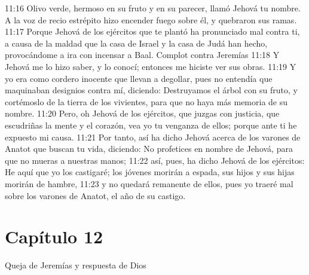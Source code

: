 11:16 Olivo verde, hermoso en su fruto y en su parecer, llamó Jehová tu nombre. A la voz de recio estrépito hizo encender fuego sobre él, y quebraron sus ramas. 
11:17 Porque Jehová de los ejércitos que te plantó ha pronunciado mal contra ti, a causa de la maldad que la casa de Israel y la casa de Judá han hecho, provocándome a ira con incensar a Baal. 
Complot contra Jeremías 
11:18 Y Jehová me lo hizo saber, y lo conocí; entonces me hiciste ver sus obras. 
11:19 Y yo era como cordero inocente que llevan a degollar, pues no entendía que maquinaban designios contra mí, diciendo: Destruyamos el árbol con su fruto, y cortémoslo de la tierra de los vivientes, para que no haya más memoria de su nombre. 
11:20 Pero, oh Jehová de los ejércitos, que juzgas con justicia, que escudriñas la mente y el corazón, vea yo tu venganza de ellos; porque ante ti he expuesto mi causa. 
11:21 Por tanto, así ha dicho Jehová acerca de los varones de Anatot que buscan tu vida, diciendo: No profetices en nombre de Jehová, para que no mueras a nuestras manos; 
11:22 así, pues, ha dicho Jehová de los ejércitos: He aquí que yo los castigaré; los jóvenes morirán a espada, sus hijos y sus hijas morirán de hambre, 
11:23 y no quedará remanente de ellos, pues yo traeré mal sobre los varones de Anatot, el año de su castigo. 
\section*{Capítulo 12 }
Queja de Jeremías y respuesta de Dios 
 
